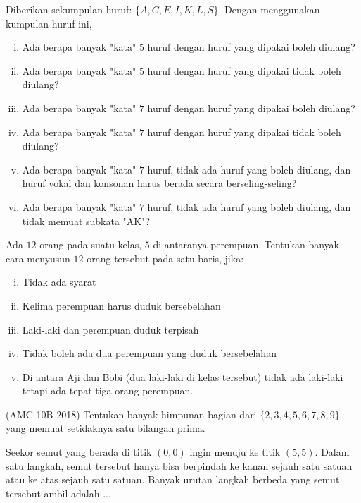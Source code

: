 \documentclass[11pt]{scrartcl}
\begin{document}
\begin{problem}
    Diberikan sekumpulan huruf: $\{A,C,E,I,K,L,S\}$. Dengan menggunakan kumpulan huruf ini,
    \begin{enumerate}[i.]
        \item Ada berapa banyak "kata" $5$ huruf dengan huruf yang dipakai boleh diulang?
        \item Ada berapa banyak "kata" $5$ huruf dengan huruf yang dipakai tidak boleh diulang?
        \item Ada berapa banyak "kata" $7$ huruf dengan huruf yang dipakai boleh diulang?
        \item Ada berapa banyak "kata" $7$ huruf dengan huruf yang dipakai tidak boleh diulang?
        \item Ada berapa banyak "kata" $7$ huruf, tidak ada huruf yang boleh diulang, dan huruf vokal dan konsonan harus berada secara berseling-seling?
        \item Ada berapa banyak "kata" $7$ huruf, tidak ada huruf yang boleh diulang, dan tidak memuat subkata "AK"?
    \end{enumerate}
\end{problem}

\begin{problem}
    Ada $12$ orang pada suatu kelas, $5$ di antaranya perempuan. Tentukan banyak cara menyusun $12$ orang tersebut pada satu baris, jika:
    \begin{enumerate}[i.]
        \item Tidak ada syarat
        \item Kelima perempuan harus duduk bersebelahan
        \item Laki-laki dan perempuan duduk terpisah
        \item Tidak boleh ada dua perempuan yang duduk bersebelahan
        \item Di antara Aji dan Bobi (dua laki-laki di kelas tersebut) tidak ada laki-laki tetapi ada tepat tiga orang perempuan.
    \end{enumerate}
\end{problem}

\begin{problem}
    (AMC 10B 2018) Tentukan banyak himpunan bagian dari $\{2, 3, 4, 5, 6, 7, 8, 9\}$ yang memuat setidaknya satu bilangan prima.
\end{problem}

\begin{problem}
    Seekor semut yang berada di titik $(0, 0)$ ingin menuju ke titik $(5, 5)$. Dalam satu langkah, semut tersebut hanya bisa berpindah ke kanan sejauh satu satuan atau ke atas sejauh satu satuan. Banyak urutan langkah berbeda yang semut tersebut ambil adalah ...
\end{problem}
\end{document}

